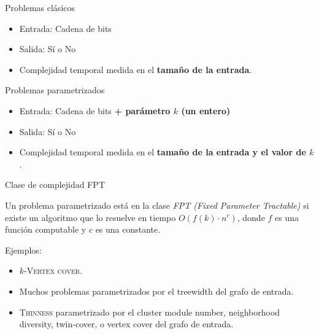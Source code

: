 \documentclass[spanish]{beamer}
\begin{document}
\begin{frame}{Problemas clásicos}
    \begin{itemize}
        \item Entrada: Cadena de bits
        \item Salida: Sí o No
        \item Complejidad temporal medida en el \textbf{tamaño de la entrada}.
    \end{itemize}
\end{frame}


\begin{frame}{Problemas parametrizados}
    \begin{itemize}
    \item Entrada: Cadena de bits \textbf{+ parámetro $k$ (un entero)}
    \item Salida: Sí o No
    \item Complejidad temporal medida en el \textbf{tamaño de la entrada y el valor de $k$}.
    \end{itemize}
\end{frame}

\begin{frame}{Clase de complejidad FPT}
    \begin{definition}[FPT]
    Un problema parametrizado está en la clase \emph{FPT (Fixed Parameter Tractable)} si existe un algoritmo que lo resuelve en tiempo $O(f(k) \cdot n^c)$, donde $f$ es una función computable y $c$ es una constante.
    \end{definition}
    \pause

    Ejemplos:
    \begin{itemize}
        \item<2-> $k$-\textsc{Vertex cover}.
        \item<3-> Muchos problemas parametrizados por el treewidth del grafo de entrada.
        \item<4-> \textsc{Thinness} parametrizado por el cluster module number, neighborhood diversity, twin-cover, o vertex cover del grafo de entrada.
    \end{itemize}
\end{frame}
\end{document}
